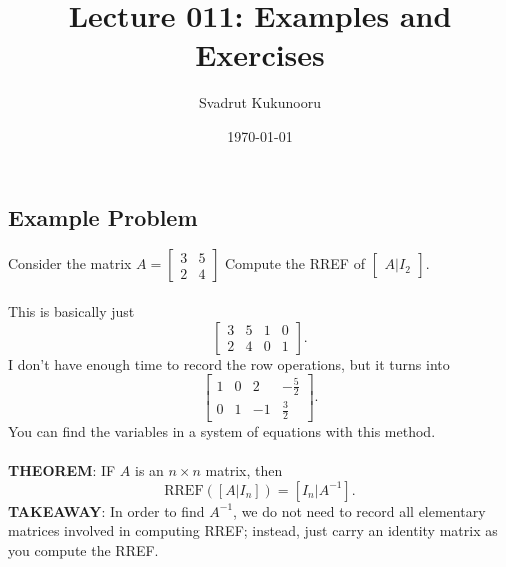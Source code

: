 \documentclass[letterpaper]{report}
\title{Lecture 011: Examples and Exercises}
\author{Svadrut Kukunooru}
\date{\today}
\begin{document}
\begin{titlepage}
    \maketitle
\end{titlepage}

\subsection{Example Problem}%
\label{sub:Example Problem}
Consider the matrix $A = \begin{bmatrix} 
    3 & 5 \\
    2 & 4
\end{bmatrix} $
Compute the RREF of $ \begin{bmatrix} 
 A | I_2
\end{bmatrix} $.  \\ \\ 
This is basically just 
\[
    \begin{bmatrix}
    3 & 5 & 1 & 0 \\
    2 & 4 & 0 & 1
    \end{bmatrix}
.\] 
I don't have enough time to record the row operations, but it turns into 
\[
\begin{bmatrix} 
    1 & 0 & 2 & -\frac{5}{2} \\ 
    0 & 1 & -1 & \frac{3}{2}
\end{bmatrix} 
.\] 
You can find the variables in a system of equations with this method. 
\\ \\
\textbf{THEOREM}: IF $A$ is an $n\times n$ matrix, then 
\[
    \text{RREF}([A | I_n]) = [I_n | A^{-1}]
.\] 
\textbf{TAKEAWAY}: In order to find $A^{-1}$, we do not need to record all elementary matrices involved in computing RREF; instead, just carry an identity matrix as you compute the RREF. 
\end{document}
